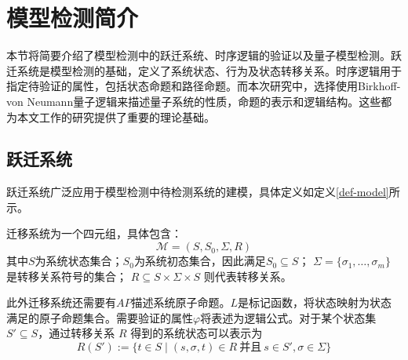 

\section{模型检测简介}
本节将简要介绍了模型检测中的跃迁系统、时序逻辑的验证以及量子模型检测。跃迁系统是模型检测的基础，定义了系统状态、行为及状态转移关系。时序逻辑用于指定待验证的属性，包括状态命题和路径命题。而本次研究中，选择使用Birkhoff-von Neumann量子逻辑来描述量子系统的性质，命题的表示和逻辑结构。这些都为本文工作的研究提供了重要的理论基础。
\subsection{跃迁系统}
\label{sec-transition}
跃迁系统广泛应用于模型检测中待检测系统的建模，具体定义如定义\ref{def-model}所示。
\begin{definition}\citep{baier2008principles}
    \label{def-model}
    迁移系统为一个四元组，具体包含：
    \begin{equation}
        \mathcal{M}=(S, S_0, \Sigma, R)
    \end{equation}
    其中\(S\)为系统状态集合；\(S_0\)为系统初态集合，因此满足\(S_0\subseteq S\)； $\Sigma=\{\sigma_1,\ldots,\sigma_m\}$ 是转移关系符号的集合； $R \subseteq S \times \Sigma \times S$ 则代表转移关系。
\end{definition}

此外迁移系统还需要有\(AP\)描述系统原子命题。$L$是标记函数，将状态映射为状态满足的原子命题集合。需要验证的属性\(\varphi\)将表述为逻辑公式。对于某个状态集 $S' \subseteq S$，通过转移关系 $R$ 得到的系统状态可以表示为
\begin{equation}\label{eq:image}
R(S') := \{ t\in S \mid (s, \sigma, t) \in R\ \text{并且}\ s \in S', \sigma \in \Sigma\}
\end{equation}


